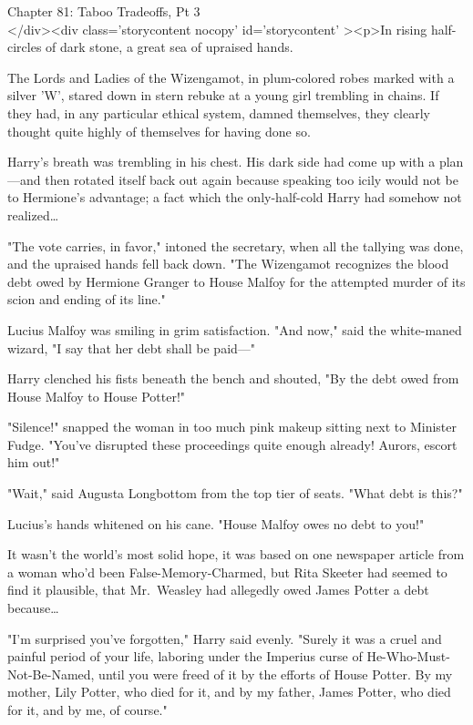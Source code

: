 
Chapter 81: Taboo Tradeoffs, Pt 3\\
</div><div  class='storycontent nocopy' id='storycontent' ><p>In rising 
half-circles of dark stone, a great sea of upraised hands.

The Lords and Ladies of the Wizengamot, in plum-colored robes marked with a 
silver 'W', stared down in stern rebuke at a young girl trembling in chains. If 
they had, in any particular ethical system, damned themselves, they clearly 
thought quite highly of themselves for having done so.

Harry's breath was trembling in his chest. His dark side had come up with a 
plan---and then rotated itself back out again because speaking too icily would 
not be to Hermione's advantage; a fact which the only-half-cold Harry had 
somehow not realized{\ldots}

"The vote carries, in favor," intoned the secretary, when all the tallying was 
done, and the upraised hands fell back down. "The Wizengamot recognizes the 
blood debt owed by Hermione Granger to House Malfoy for the attempted murder of 
its scion and ending of its line."

Lucius Malfoy was smiling in grim satisfaction. "And now," said the white-maned 
wizard, "I say that her debt shall be paid---"

Harry clenched his fists beneath the bench and shouted, "By the debt owed from 
House Malfoy to House Potter!"

"Silence!" snapped the woman in too much pink makeup sitting next to Minister 
Fudge. "You've disrupted these proceedings quite enough already! Aurors, escort 
him out!"

"Wait," said Augusta Longbottom from the top tier of seats. "What debt is this?"

Lucius's hands whitened on his cane. "House Malfoy owes no debt to you!"

It wasn't the world's most solid hope, it was based on one newspaper article 
from a woman who'd been False-Memory-Charmed, but Rita Skeeter had seemed to 
find it plausible, that Mr.~Weasley had allegedly owed James Potter a debt 
because{\ldots}

"I'm surprised you've forgotten," Harry said evenly. "Surely it was a cruel and 
painful period of your life, laboring under the Imperius curse of 
He-Who-Must-Not-Be-Named, until you were freed of it by the efforts of House 
Potter. By my mother, Lily Potter, who died for it, and by my father, James 
Potter, who died for it, and by me, of course."

